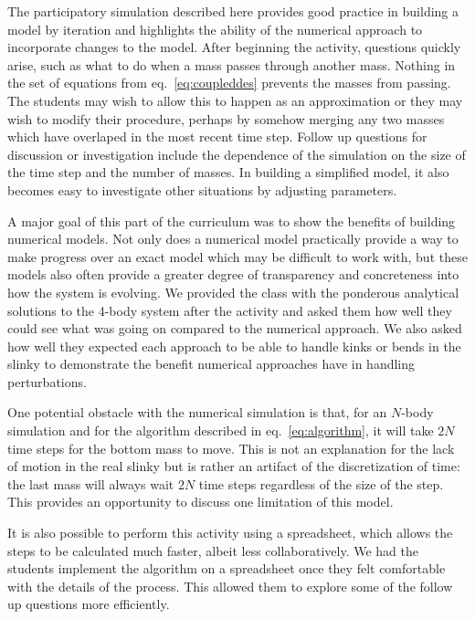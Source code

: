 \documentclass[prb,preprint,superscriptaddress]{revtex4-1}
\newcommand{\eq}[1]{eq.~\eqref{eq:#1}}
\begin{document}
The participatory simulation described here provides good practice in building
a model by iteration and highlights the ability of the numerical approach to incorporate changes to the model. After beginning the activity, questions quickly arise, such
as what to do when a mass passes through another mass. Nothing in the set of equations from \eq{coupleddes} prevents
the masses from passing. The students may wish to allow this to happen as an approximation
or they may wish to modify their procedure, perhaps by somehow merging any two masses which have overlaped
in the most recent time step. Follow up questions for discussion or investigation include
the dependence of the simulation on the size of the time step and the number of masses.
In building a simplified model, it also becomes easy to investigate
other situations by adjusting parameters.

A major goal of this part of the curriculum was to show the benefits of building
numerical models. Not only does a numerical model
practically provide a way to make progress over an exact model which may be difficult
to work with, but these models also often provide a greater degree of transparency and
concreteness into how the system is evolving. We provided the class with the
ponderous analytical solutions to the 4-body system after the activity and asked
them how well they could see what was going on compared to the numerical
approach. We also asked how well they expected each approach to be able to
handle kinks or bends in the slinky to demonstrate the benefit numerical
approaches have in handling perturbations.

One potential obstacle with the numerical simulation is that, for an $N$-body simulation and for the algorithm described in \eq{algorithm},
it will take $2N$ time steps for the bottom mass to move. This is not an explanation for
the lack of motion in the real slinky but is rather an artifact of the discretization of time:
the last mass will always wait $2N$ time steps regardless of the size of the step.
This provides an opportunity to discuss one limitation of this model.

It is also possible to perform this activity using a spreadsheet, which allows the steps to be
calculated much faster, albeit less collaboratively. We had the students implement the algorithm on a spreadsheet once they
felt comfortable with the details of the process. This allowed them to explore some of the follow
up questions more efficiently.
\end{document}
